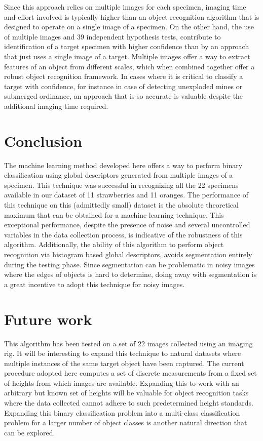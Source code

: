 Since this approach relies on multiple images for each specimen, imaging time and effort involved is typically higher than an object recognition algorithm that is designed to operate on a single image of a specimen. On the other hand, the use of multiple images and 39 independent hypothesis tests, contribute to identification of a target specimen with higher confidence than by an approach that just uses a single image of a target. Multiple images offer a way to extract features of an object from different scales, which when combined together offer a robust object recognition framework. In cases where it is critical to classify a target with confidence, for instance in case of detecting unexploded mines or submerged ordinance, an approach that is so accurate is  valuable despite the additional imaging time required.

\section{Conclusion}

The machine learning method developed here offers a way to perform binary classification using global descriptors generated from multiple images of a specimen. This technique was successful in recognizing all the 22 specimens available in our dataset of 11 strawberries and 11 oranges. The performance of this technique on this (admittedly small) dataset is the absolute theoretical maximum that can be obtained for a machine learning technique. This exceptional performance, despite the presence of noise and several uncontrolled variables in the data collection process, is indicative of the robustness of this algorithm. Additionally, the ability of this algorithm to perform object recognition via histogram based global descriptors, avoids segmentation entirely during the testing phase. Since segmentation can be problematic in noisy images where the edges of objects is hard to determine, doing away with segmentation is a great incentive to adopt this technique for noisy images.
\section{Future work}

This algorithm has been tested on a set of 22 images collected using an imaging rig. It will be interesting to expand this technique to natural datasets where multiple instances of the same target object have been captured. The current procedure adopted here computes a set of discrete measurements from a fixed set of heights from which images are available. Expanding this to work with an arbitrary but known set of heights will be valuable for object recognition tasks where the data collected cannot adhere to such predetermined height standards. Expanding this binary classification problem into a multi-class classification problem for a larger number of object classes is another natural direction that can be explored.




